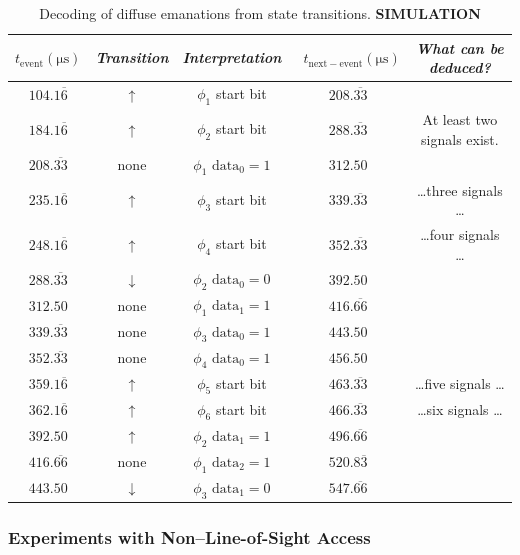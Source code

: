 \documentclass{acmtrans2e}
\begin{document}
\begin{table}
\centering
\caption{Decoding of diffuse emanations from state transitions. \bf{SIMULATION}}
\vspace{.1in}
\label{decoding_diffuse_emanations_table}
\begin{tabular}{|c|c|c|c|c|}
\hline
$t_\mathrm{event} \mathrm{(\mu s)}$ & {\it Transition} & {\it Interpretation} & \
$t_\mathrm{next-event} \mathrm{(\mu s)}$ & {\it What can be deduced?}
\rule{0in}{2.5ex} \\ [0.5ex]
\hline
$104.1\overline{6}$ & $\uparrow$ & $\phi_1$ start bit & $208.\overline{33}$ & \rule{0in}{2.5ex} \\
$184.1\overline{6}$ & $\uparrow$ & $\phi_2$ start bit & $288.\overline{33}$ & At least two signals exist.\\
$208.\overline{33}$ & none & $\phi_1$ $\mathrm{data}_0 = 1$ & $312.50$ & \ \\
$235.1\overline{6}$ & $\uparrow$ & $\phi_3$ start bit & $339.\overline{33}$ & \ldots three signals \ldots \\
$248.1\overline{6}$ & $\uparrow$ & $\phi_4$ start bit & $352.\overline{33}$ & \ldots four signals \ldots \\
$288.\overline{33}$ & $\downarrow$ & $\phi_2$ $\mathrm{data}_0 = 0$ & $392.50$ & \ \\
$312.50$ & none & $\phi_1$ $\mathrm{data}_1 = 1$ & $416.\overline{66}$ & \ \\
$339.\overline{33}$ & none & $\phi_3$ $\mathrm{data}_0 = 1$ & $443.50$ & \ \\
$352.\overline{33}$ & none & $\phi_4$ $\mathrm{data}_0 = 1$ & $456.50$ & \ \\
$359.1\overline{6}$ & $\uparrow$ & $\phi_5$ start bit & $463.\overline{33}$ & \ldots five signals \ldots \\
$362.1\overline{6}$ & $\uparrow$ & $\phi_6$ start bit & $466.\overline{33}$ & \ldots six signals \ldots \\
$392.50$ & $\uparrow$ & $\phi_2$ $\mathrm{data}_1 = 1$ & $496.\overline{66}$ & \ \\
$416.\overline{66}$ & none & $\phi_1$ $\mathrm{data}_2 = 1$ & $520.8\overline{3}$ & \ \\
$443.50$ & $\downarrow$ & $\phi_3$ $\mathrm{data}_1 =  0$ & $547.\overline{66}$ & \ \\
\hline
\end{tabular}
\end{table}

\subsubsection{Experiments with Non--Line-of-Sight Access}
\end{document}
